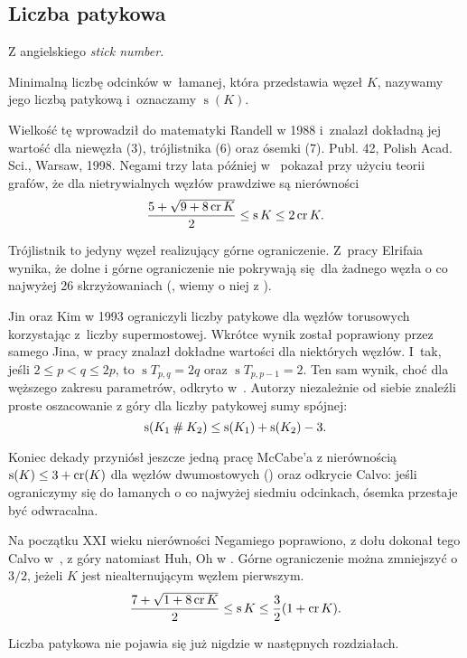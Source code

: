 
\subsection{Liczba patykowa} %

Z angielskiego \emph{stick number}.

\begin{definition}
    Minimalną liczbę odcinków w~łamanej, która przedstawia węzeł $K$, nazywamy jego liczbą patykową i~oznaczamy $\operatorname{s}(K)$.
\end{definition}

Wielkość tę wprowadził do matematyki Randell w 1988 i~znalazł dokładną jej wartość dla niewęzła (3), trójlistnika (6) oraz ósemki (7).
Publ. 42, Polish Acad. Sci., Warsaw, 1998.
Negami trzy lata później w~\cite{negami91} pokazał przy użyciu teorii grafów, że dla nietrywialnych węzłów prawdziwe są nierówności
\begin{equation}
    \frac{5+\sqrt{9 + 8 \operatorname{cr} K}}{2} \le \operatorname{s} K \le 2 \operatorname{cr} K.
\end{equation}

Trójlistnik to jedyny węzeł realizujący górne ograniczenie.
Z~pracy Elrifaia wynika, że dolne i górne ograniczenie nie pokrywają się dla żadnego węzła o co najwyżej 26 skrzyżowaniach (\cite{elrifai06}, wiemy o niej z \cite[s. 1]{huh11}).

Jin oraz Kim w 1993 ograniczyli liczby patykowe dla węzłów torusowych korzystając z~liczby supermostowej.
Wkrótce wynik został poprawiony przez samego Jina, w pracy \cite{jin97} znalazł dokładne wartości dla niektórych węzłów.
I~tak, jeśli $2 \le p < q \le 2p$, to $\operatorname{s} T_{p,q} = 2q$ oraz $\operatorname{s} T_{p, p-1} = 2$.
Ten sam wynik, choć dla węższego zakresu parametrów, odkryto w~\cite{greilsheimer97}.
Autorzy niezależnie od siebie znaleźli proste oszacowanie z góry dla liczby patykowej sumy spójnej:
\begin{equation}
    \operatorname{s}(K_1 \mathbin{\#} K_2) \le \operatorname{s}(K_1) + \operatorname{s}(K_2) - 3.
\end{equation}

Koniec dekady przyniósł jeszcze jedną pracę McCabe'a z nierównością $\operatorname{s}(K) \le 3 + \operatorname{cr} (K)$ dla węzłów dwumostowych (\cite{mccabe98}) oraz odkrycie Calvo: jeśli ograniczymy się do łamanych o co najwyżej siedmiu odcinkach, ósemka przestaje być odwracalna.

Na początku XXI wieku nierówności Negamiego poprawiono, z dołu dokonał tego Calvo w~\cite{calvo01}, z góry natomiast Huh, Oh w \cite{huh11}.
Górne ograniczenie można zmniejszyć o $3/2$, jeżeli $K$ jest niealternującym węzłem pierwszym.
\begin{equation}
    \frac{7+\sqrt{1 + 8 \operatorname{cr} K}}{2} \le \operatorname{s} K \le \frac{3}{2} (1 + \operatorname{cr} K).
\end{equation}

Liczba patykowa nie pojawia się już nigdzie w następnych rozdziałach.

